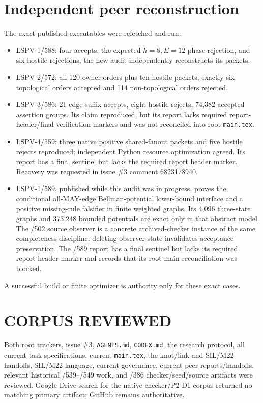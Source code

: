 \documentclass[11pt]{article}
\begin{document}
\section*{Independent peer reconstruction}
The exact published executables were refetched and run:
\begin{itemize}
\item LSPV-1/588: four accepts, the expected \(h=8,E=12\) phase rejection, and six hostile rejections; the new audit independently reconstructs its packets.
\item LSPV-2/572: all 120 owner orders plus ten hostile packets; exactly six topological orders accepted and 114 non-topological orders rejected.
\item LSPV-3/586: 21 edge-suffix accepts, eight hostile rejects, 74,382 accepted assertion groups. Its claim reproduced, but its report lacks required report-header/final-verification markers and was not reconciled into root \texttt{main.tex}.
\item LSPV-4/559: three native positive shared-fanout packets and five hostile rejects reproduced; independent Python resource optimization agreed. Its report has a final sentinel but lacks the required report header marker. Recovery was requested in issue \#3 comment 6823178940.
\item LSPV-1/589, published while this audit was in progress, proves the
conditional all-MAY-edge Bellman-potential lower-bound interface and a
positive missing-rule falsifier in finite weighted graphs.  Its 4,096
three-state graphs and 373,248 bounded potentials are exact only in that
abstract model.  The /502 source observer is a concrete archived-checker
instance of the same completeness discipline: deleting observer state
invalidates acceptance preservation.  The /589 report has a final sentinel
but lacks its required report-header marker and records that its root-main
reconciliation was blocked.
\end{itemize}
A successful build or finite optimizer is authority only for these exact cases.

\section*{CORPUS REVIEWED}
Both root trackers, issue \#3, \texttt{AGENTS.md}, \texttt{CODEX.md}, the research protocol, all current task specifications, current \texttt{main.tex}, the knot/link and SIL/M22 handoffs, SIL/M22 language, current governance, current peer reports/handoffs, relevant historical /539--/549 work, and /386 checker/seed/source artifacts were reviewed.
Google Drive search for the native checker/P2-D1 corpus returned no matching primary artifact; GitHub remains authoritative.
\end{document}
